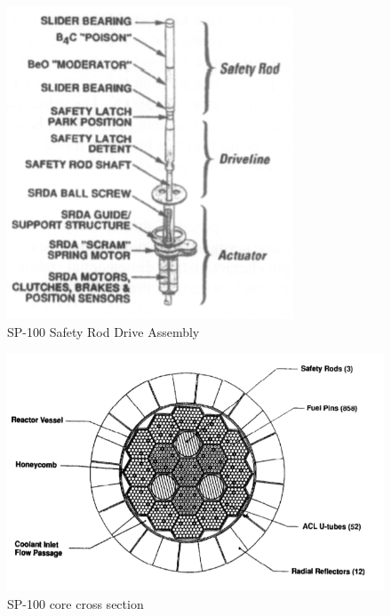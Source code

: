 \documentclass{article}
\begin{document}
\begin{figure}[]
	\centering
	\includegraphics[height=0.45\textheight]{fig/appF}
	\caption[SP-100 Safety Rod Drive Assembly]{SP-100 Safety Rod Drive Assembly~\cite{anderson1983power}}
	\label{appF}
\end{figure}

\begin{figure}[]
	\centering
	\includegraphics[height=0.45\textheight]{fig/appG}
	\caption[SP-100 core cross section]{SP-100 core cross section~\cite{anderson1983power}}
	\label{appG}
\end{figure}
\end{document}
